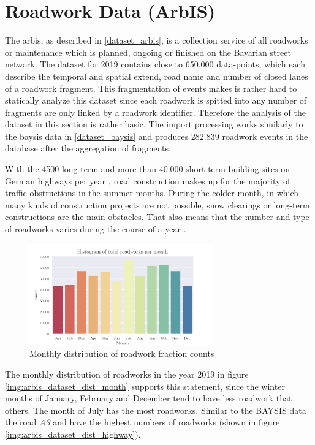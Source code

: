 \section{Roadwork Data (ArbIS)}
\label{dataset_arbis}

The \acrfull{arbis}, as described in \autoref{dataset_arbis}, is a collection service of all roadworks or maintenance which is planned, ongoing or finished on the Bavarian street network. The dataset for 2019 contains close to 650.000 data-points, which each describe the temporal and spatial extend, road name and number of closed lanes of a roadwork fragment. This fragmentation of events makes is rather hard to statically analyze this dataset since each roadwork is spitted into any number of fragments are only linked by a roadwork identifier. Therefore the analysis of the dataset in this section is rather basic. The import processing works similarly to the \acrshort{baysis} data in \autoref{dataset_baysis} and produces 282.839 roadwork events in the database after the aggregation of fragments. 

With the 4500 long term and more than 40.000 short term building sites on German highways per year \parencite{LAPID2018,Stmi2020}, road construction makes up for the majority of traffic obstructions in the summer months. During the colder month, in which many kinds of construction projects are not possible, snow clearings or long-term constructions are the main obstacles. That also means that the number and type of roadworks varies during the course of a year \parencite{Stmi2020}. 

\begin{figure}[ht]
	\centering
	\includegraphics[width=0.7\textwidth]{../CorrAnalysis/data/ArbIS/01_dataset/plots/arbis_dataset_hist_month}
	\caption{Monthly distribution of roadwork fraction counts}
	\label{img:arbis_dataset_dist_month}
\end{figure}

The monthly distribution of roadworks in the year 2019 in figure \autoref{img:arbis_dataset_dist_month} supports this statement, since the winter months of January, February and December tend to have less roadwork that others. The month of July has the most roadworks. Similar to the BAYSIS data the road \textit{A3} and  have the highest numbers of roadworks (shown in figure \autoref{img:arbis_dataset_dist_highway}).

